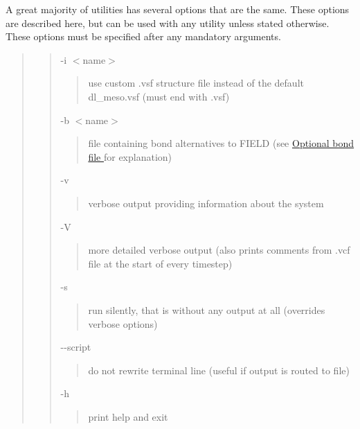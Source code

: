 A great majority of utilities has several options that are the same. These options are described here, but can be used with any utility unless stated otherwise. These options must be specified after any mandatory arguments.

\begin{quote}
\begin{quote}
{\ttfamily -\/i $<$name$>$} \begin{quote}
use custom {\ttfamily .vsf} structure file instead of the default {\ttfamily dl\+\_\+meso.\+vsf} (must end with {\ttfamily .vsf}) \end{quote}
{\ttfamily -\/b $<$name$>$} \begin{quote}
file containing bond alternatives to {\ttfamily F\+I\+E\+LD} (see \hyperlink{InputFiles_BondFile}{Optional bond file } for explanation) \end{quote}
{\ttfamily -\/v} \begin{quote}
verbose output providing information about the system \end{quote}
{\ttfamily -\/V} \begin{quote}
more detailed verbose output (also prints comments from {\ttfamily .vcf} file at the start of every timestep) \end{quote}
{\ttfamily -\/s} \begin{quote}
run silently, that is without any output at all (overrides verbose options) \end{quote}
{\ttfamily -\/-\/script} \begin{quote}
do not rewrite terminal line (useful if output is routed to file) \end{quote}
{\ttfamily -\/h} \begin{quote}
print help and exit\end{quote}
\end{quote}
\end{quote}
